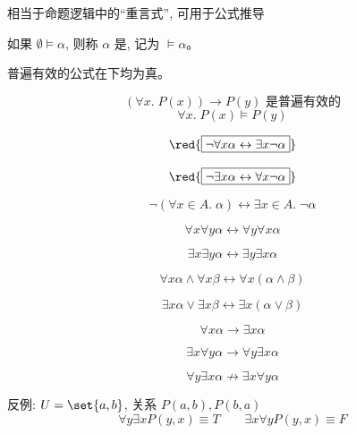 \begin{frame}{}
  \begin{center}
    相当于命题逻辑中的``重言式'', 可用于公式推导
  \end{center}

  \begin{definition}
    如果 $\emptyset \models \alpha$, 则称 $\alpha$ 是,
    记为 $\models \alpha$。
  \end{definition}

  \pause
  \vspace{0.60cm}
  \begin{center}
    普遍有效的公式在下均为真。

    \[
      (\forall x.\; P(x)) \to P(y) \text{ 是普遍有效的}
    \]
    \[
      \forall x.\; P(x) \models P(y)
    \]
  \end{center}
\end{frame}

\begin{frame}{}
  \[
    \red{\boxed{\lnot \forall x \alpha \leftrightarrow \exists x \lnot \alpha}}
  \]

  \[
    \red{\boxed{\lnot \exists x \alpha \leftrightarrow \forall x \lnot \alpha}}
  \]

  \pause
  \[
    \lnot (\forall x \in A.\; \alpha) \leftrightarrow \exists x \in A.\; \lnot \alpha
  \]
\end{frame}

\begin{frame}{}
  \[
    \forall x \forall y \alpha \leftrightarrow \forall y \forall x \alpha
  \]

  \[
    \exists x \exists y \alpha \leftrightarrow \exists y \exists x \alpha
  \]
\end{frame}

\begin{frame}{}
  \[
    \forall x \alpha \land \forall x \beta
      \leftrightarrow \forall x (\alpha \land \beta)
  \]

  \[
    \exists x \alpha \lor \exists x \beta
      \leftrightarrow \exists x (\alpha \lor \beta)
  \]
\end{frame}

\begin{frame}{}
  \[
    \forall x \alpha \to \exists x \alpha
  \]

  \[
    \exists x \forall y \alpha \to \forall y \exists x \alpha
  \]

  \[
    \forall y \exists x \alpha \not\to \exists x \forall y \alpha
  \]

  \pause
  \vspace{0.30cm}
  \begin{center}
    反例: $U = \set{a, b}$, \qquad 关系 $P(a, b), P(b, a)$
    \[
      \forall y \exists x P(y, x) \equiv T \qquad \exists x \forall y P(y, x) \equiv F
    \]
  \end{center}
\end{frame}

